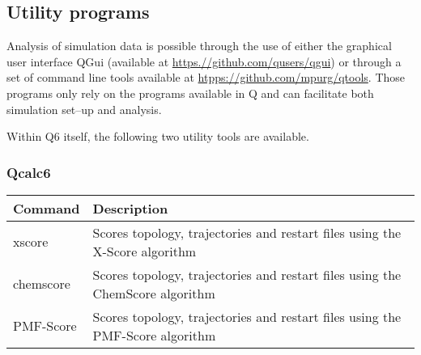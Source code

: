 \documentclass[a4paper,11pt]{article}
\begin{document}


\subsection{Utility programs}
Analysis of simulation data is possible through the use of either
the graphical user interface QGui (available at 
\url{https.//github.com/qusers/qgui}) or through a set of command
line tools available at \url{htpps://github.com/mpurg/qtools}.
Those programs only rely on the programs available in Q
and can facilitate both simulation set--up and analysis.

Within Q6 itself, the following two utility tools are available.

\subsubsection{\textbf{Qcalc6}}\label{subsubsec:qcalc}


\begin{tabularx}{\textwidth}{|l|X|}
\hline
  \textbf{Command} & \textbf{Description} \\
  \hline
  xscore           & Scores topology, trajectories and restart files using the X-Score algorithm \\
  chemscore        & Scores topology, trajectories and restart files using the ChemScore algorithm \\
  PMF-Score        & Scores topology, trajectories and restart files using the PMF-Score algorithm \\
\hline
\end{tabularx}
\end{document}
